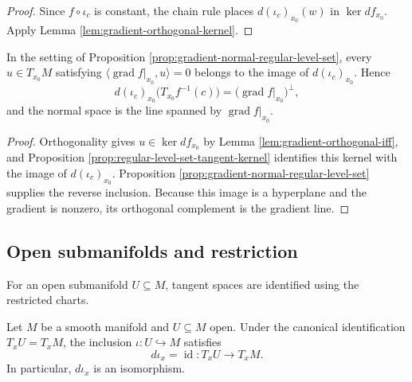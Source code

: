 \begin{proof}

\sketch Since $f\circ\iota_c$ is constant, the chain rule places
$d(\iota_c)_{x_0}(w)$ in $\ker df_{x_0}$. Apply
Lemma \ref{lem:gradient-orthogonal-kernel}.
\end{proof}

\begin{proposition}
\label{prop:tangent-space-regular-level-set-gradient-orthogonal}





In the setting of Proposition \ref{prop:gradient-normal-regular-level-set}, every
$u\in T_{x_0}M$ satisfying
$\langle\operatorname{grad}f|_{x_0},u\rangle=0$ belongs to the image of
$d(\iota_c)_{x_0}$. Hence
\[
d(\iota_c)_{x_0}\bigl(T_{x_0}f^{-1}(c)\bigr)
=\bigl(\operatorname{grad}f|_{x_0}\bigr)^\perp,
\]
and the normal space is the line spanned by $\operatorname{grad}f|_{x_0}$.
\end{proposition}

\begin{proof}

\sketch Orthogonality gives $u\in\ker df_{x_0}$ by
Lemma \ref{lem:gradient-orthogonal-iff}, and Proposition
\ref{prop:regular-level-set-tangent-kernel} identifies this kernel with the image
of $d(\iota_c)_{x_0}$. Proposition
\ref{prop:gradient-normal-regular-level-set} supplies the reverse inclusion.
Because this image is a hyperplane and the gradient is nonzero, its orthogonal
complement is the gradient line.
\end{proof}

\subsection*{Open submanifolds and restriction}

For an open submanifold $U\subseteq M$, tangent spaces are identified using the
restricted charts.

\begin{lemma}
\label{lem:opens-inclusion-differential}




Let $M$ be a smooth manifold and $U\subseteq M$ open. Under the canonical
identification $T_xU=T_xM$, the inclusion $\iota\colon U\hookrightarrow M$ satisfies
\[
d\iota_x=\operatorname{id}\colon T_xU\longrightarrow T_xM.
\]
In particular, $d\iota_x$ is an isomorphism.
\end{lemma}

